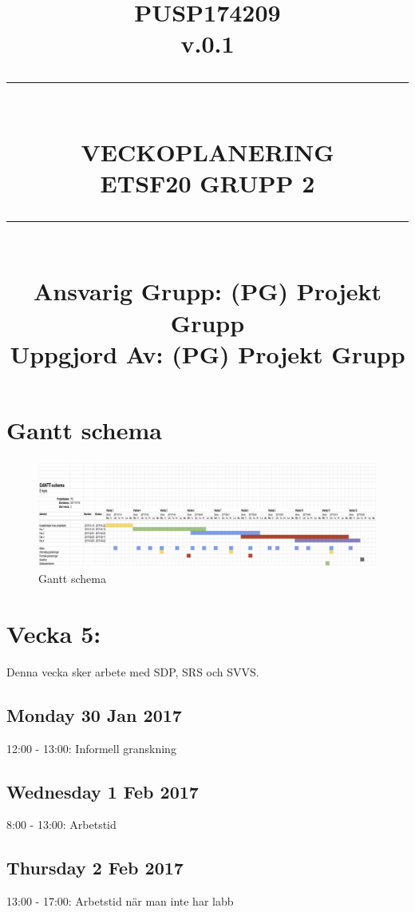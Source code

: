 \documentclass[paper=a4, fontsize=11pt,twoside]{article}
\title{
		\documentNumber{#1}																						
		\documentVersion{#2}																				
		\HRule{0.5pt} \\ %
		\LARGE \textbf{\uppercase{#3}} \\
		\large \textbf{\uppercase{ETSF20 Grupp 2}} 
		\HRule{2pt} \\ [1.5cm]    
		\normalsize            
		\documentResponsible{#4} \\ 
		\documentCreator{#4}  
	}
\newcommand{\HRule}[1]{\rule{\linewidth}{#1}}
\newcommand{\documentNumber}[1]{\centering PUSP1742#1 \\[1.0cm]}
\newcommand{\documentVersion}[1]{\centering \small{v.#1} \\[1.0cm]}
\newcommand{\documentResponsible}[1]{\centering  Ansvarig Grupp: #1}
\newcommand{\documentCreator}[1]{\centering Uppgjord Av: #1}
\newcommand{\grouptitlepage}[4]{ 
	\title{
		\documentNumber{#1}																						
		\documentVersion{#2}																				
		\HRule{0.5pt} \\ %
		\LARGE \textbf{\uppercase{#3}} \\
		\large \textbf{\uppercase{ETSF20 Grupp 2}} 
		\HRule{2pt} \\ [1.5cm]    
		\normalsize            
		\documentResponsible{#4} \\ 
		\documentCreator{#4}  
	}																							
	\maketitle																							
	\thispagestyle{empty} 																					
	\newpage 
}
\begin{document}
\grouptitlepage
{09}
{0.1}
{Veckoplanering}
{(PG) Projekt Grupp}


\section{Gantt schema}
\begin{figure}[H]
\centering
\includegraphics[width = 17cm]{e-kyss-gantt.png} %
\caption{Gantt schema}
\end{figure}


\section*{Vecka 5:}
Denna vecka sker arbete med SDP, SRS och SVVS.\\
\subsection*{Monday 30 Jan 2017}
	12:00 - 13:00: Informell granskning\\
\subsection*{Wednesday 1 Feb 2017}
	8:00 - 13:00: Arbetstid\\
\subsection*{Thursday 2 Feb 2017}
	13:00 - 17:00: Arbetstid när man inte har labb\\
\end{document}
